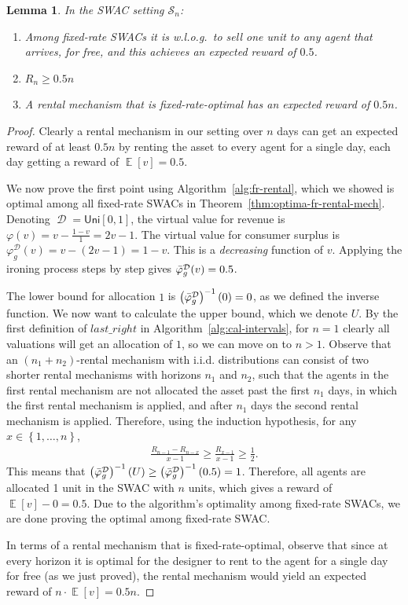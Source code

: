\documentclass[11pt,letterpaper]{article}
\newcommand{\set}[1]{\left\{#1\right\}}
\newcommand{\brackets}[1]{\left( #1 \right)}
\newcommand{\fr}{fixed-rate\xspace}
\newcommand{\swac}{SWAC\xspace}
\newcommand{\swacs}{SWACs\xspace}
\DeclareMathOperator*{\E}{\bb{E}}
\newcommand{\Uni}{\mathsf{Uni}}
\newcommand{\bb}[1]{\mathbb{#1}}
\DeclareMathOperator{\D}{\mathcal{D}}
\renewcommand{\S}{\mathcal{S}}
\newcommand{\g}{g}
\newcommand{\irn}{\Bar{\varphi}}
\theoremstyle{plain}
\newtheorem{lemma}[theorem]{Lemma}
\begin{document}
\begin{lemma}\label{lemma:best-fr-consumer-surplus}
    In the \swac setting $\S_n$:
    \begin{enumerate}
        \item Among \fr \swacs it is w.l.o.g.\ to sell one unit to any agent that arrives, for free, and this achieves an expected reward of $0.5$.
        \item $R_n\geq0.5n$
        \item A rental mechanism that is \fr-optimal has an expected reward of $0.5n$.
    \end{enumerate}
\end{lemma}
\begin{proof}
    Clearly a rental mechanism in our setting over $n$ days can get an expected reward of at least $0.5n$ by renting the asset to every agent for a single day, each day getting a reward of $\E[v]=0.5$.

    We now prove the first point using Algorithm~\ref{alg:fr-rental}, which we showed is optimal among all \fr \swacs in Theorem~\ref{thm:optima-fr-rental-mech}. Denoting $\D=\Uni[0,1]$, the virtual value for revenue is $\varphi(v)=v-\frac{1-v}{1}=2v-1$. The virtual value for consumer surplus is $\varphi_{\g}^{\D}(v)=v-\brackets{2v-1}=1-v$. This is a \emph{decreasing} function of $v$. Applying the ironing process steps by step gives $\irn_{\g}^{\D}(v)=0.5$. 

    The lower bound for allocation $1$ is $\brackets{\irn_{\g}^{\D}}^{-1}(0)=0$, as we defined the inverse function. We now want to calculate the upper bound, which we denote $U$. By the first definition of $last\_right$ in Algorithm~\ref{alg:cal-intervals}, for $n=1$ clearly all valuations will get an allocation of $1$, so we can move on to $n>1$. Observe that an $(n_1+n_2)$-rental mechanism with i.i.d. distributions can consist of two shorter rental mechanisms with horizons $n_1$ and $n_2$, such that the agents in the first rental mechanism are not allocated the asset past the first $n_1$ days, in which the first rental mechanism is applied, and after $n_1$ days the second rental mechanism is applied. Therefore, using the induction hypothesis, for any $x\in\set{1,\dots,n}$,
    \begin{align*}
        \frac{R_{n-1}-R_{n-x}}{x-1}\geq\frac{R_{x-1}}{x-1}\geq\frac{1}{2}.
    \end{align*}
    This means that $\brackets{\irn_{\g}^{\D}}^{-1}(U)\geq\brackets{\irn_{\g}^{\D}}^{-1}(0.5)=1$. Therefore, all agents are allocated 1 unit in the \swac with $n$ units, which gives a reward of $\E[v]-0=0.5$. Due to the algorithm's optimality among \fr \swacs, we are done proving the optimal among \fr \swac.

    In terms of a rental mechanism that is \fr-optimal, observe that since at every horizon it is optimal for the designer to rent to the agent for a single day for free (as we just proved), the rental mechanism would yield an expected reward of $n\cdot\E[v]=0.5n$.
\end{proof}
\end{document}
